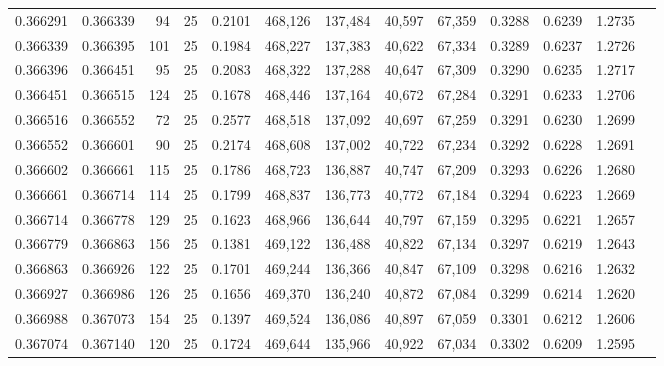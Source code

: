 \begin{tabular}{rrrrrrrrrrrrr}
0.366291 & 0.366339 &    94 &  25 &                                     0.2101 & 468,126 & 137,484 &  40,597 &  67,359 & 0.3288 & 0.6239 & 1.2735 \\
0.366339 & 0.366395 &   101 &  25 &                                     0.1984 & 468,227 & 137,383 &  40,622 &  67,334 & 0.3289 & 0.6237 & 1.2726 \\
0.366396 & 0.366451 &    95 &  25 &                                     0.2083 & 468,322 & 137,288 &  40,647 &  67,309 & 0.3290 & 0.6235 & 1.2717 \\
0.366451 & 0.366515 &   124 &  25 &                                     0.1678 & 468,446 & 137,164 &  40,672 &  67,284 & 0.3291 & 0.6233 & 1.2706 \\
0.366516 & 0.366552 &    72 &  25 &                                     0.2577 & 468,518 & 137,092 &  40,697 &  67,259 & 0.3291 & 0.6230 & 1.2699 \\
0.366552 & 0.366601 &    90 &  25 &                                     0.2174 & 468,608 & 137,002 &  40,722 &  67,234 & 0.3292 & 0.6228 & 1.2691 \\
0.366602 & 0.366661 &   115 &  25 &                                     0.1786 & 468,723 & 136,887 &  40,747 &  67,209 & 0.3293 & 0.6226 & 1.2680 \\
0.366661 & 0.366714 &   114 &  25 &                                     0.1799 & 468,837 & 136,773 &  40,772 &  67,184 & 0.3294 & 0.6223 & 1.2669 \\
0.366714 & 0.366778 &   129 &  25 &                                     0.1623 & 468,966 & 136,644 &  40,797 &  67,159 & 0.3295 & 0.6221 & 1.2657 \\
0.366779 & 0.366863 &   156 &  25 &                                     0.1381 & 469,122 & 136,488 &  40,822 &  67,134 & 0.3297 & 0.6219 & 1.2643 \\
0.366863 & 0.366926 &   122 &  25 &                                     0.1701 & 469,244 & 136,366 &  40,847 &  67,109 & 0.3298 & 0.6216 & 1.2632 \\
0.366927 & 0.366986 &   126 &  25 &                                     0.1656 & 469,370 & 136,240 &  40,872 &  67,084 & 0.3299 & 0.6214 & 1.2620 \\
0.366988 & 0.367073 &   154 &  25 &                                     0.1397 & 469,524 & 136,086 &  40,897 &  67,059 & 0.3301 & 0.6212 & 1.2606 \\
0.367074 & 0.367140 &   120 &  25 &                                     0.1724 & 469,644 & 135,966 &  40,922 &  67,034 & 0.3302 & 0.6209 & 1.2595 \\

\end{tabular}
